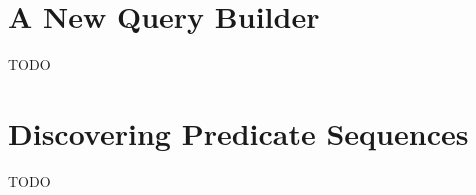 
\section{A New Query Builder}
\label{sec:new_query_builder}

TODO

\section{Discovering Predicate Sequences}
\label{sec:discovering_predicate_sequences}

TODO

